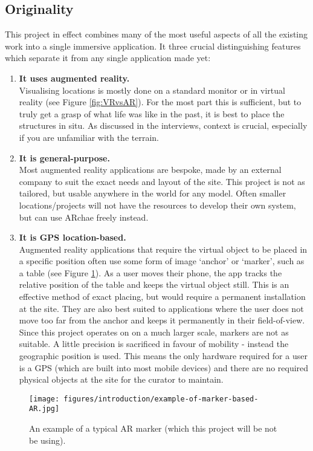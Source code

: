 \documentclass[12pt, a4paper]{article}
\begin{document}
\subsection{Originality}
This project in effect combines many of the most useful aspects of all the existing work into a single immersive application. It three crucial distinguishing features which separate it from any single application made yet:
\begin{enumerate}
    \item \textbf{It uses augmented reality.} \\
    Visualising locations is mostly done on a standard monitor or in virtual reality (see Figure \ref{fig:VRvsAR}). For the most part this is sufficient, but to truly get a grasp of what life was like in the past, it is best to place the structures in situ. As discussed in the interviews, context is crucial, especially if you are unfamiliar with the terrain.
    \item \textbf{It is general-purpose.} \\
    Most augmented reality applications are bespoke, made by an external company to suit the exact needs and layout of the site. This project is not as tailored, but usable anywhere in the world for any model. Often smaller locations/projects will not have the resources to develop their own system, but can use ARchae freely instead.
    \item \textbf{It is GPS location-based.} \\
    Augmented reality applications that require the virtual object to be placed in a specific position often use some form of image `anchor' or `marker', such as a table (see Figure \ref{fig:ARmarker}). As a user moves their phone, the app tracks the relative position of the table and keeps the virtual object still. This is an effective method of exact placing, but would require a permanent installation at the site. They are also best suited to applications where the user does not move too far from the anchor and keeps it permanently in their field-of-view. Since this project operates on on a much larger scale, markers are not as suitable. A little precision is sacrificed in favour of mobility - instead the geographic position is used. This means the only hardware required for a user is a GPS (which are built into most mobile devices) and there are no required physical objects at the site for the curator to maintain. 
\end{enumerate}

\begin{figure}[H]
    \centering
    \texttt{[image: figures/introduction/example-of-marker-based-AR.jpg]}
    \caption{An example of a typical AR marker (which this project will be not be using). \cite{originality:armarker}}
    \label{fig:ARmarker}
\end{figure}
\end{document}
